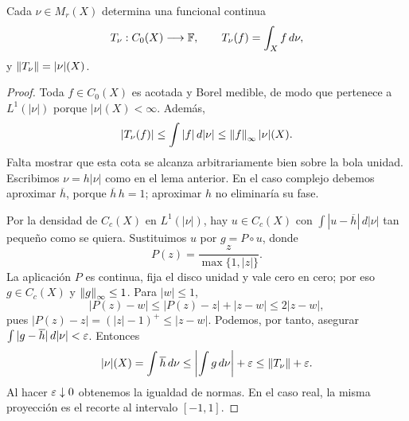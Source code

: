 \begin{teorema}\label{v2:riesz-isometria}
Cada $\nu\in M_r(X)$ determina una funcional continua
\[
 T_\nu:C_0(X)\longrightarrow\mathbb F,\qquad T_\nu(f)=\int_X f\,d\nu,
\]
y $\left\lVert T_\nu\right\rVert=|\nu|(X)$.
\end{teorema}
\begin{proof}
Toda $f\in C_0(X)$ es acotada y Borel medible, de modo que pertenece a $L^1(|\nu|)$ porque $|\nu|(X)<\infty$. Además,
\[
 |T_\nu(f)|\le\int|f|\,d|\nu|\le\left\lVert f\right\rVert_\infty |\nu|(X).
\]
Falta mostrar que esta cota se alcanza arbitrariamente bien sobre la bola unidad. Escribimos $\nu=h|\nu|$ como en el lema anterior. En el caso complejo debemos aproximar $\overline h$, porque $\overline h\,h=1$; aproximar $h$ no eliminaría su fase.

Por la densidad de $C_c(X)$ en $L^1(|\nu|)$, hay $u\in C_c(X)$ con $\int|u-\overline h|\,d|\nu|$ tan pequeño como se quiera. Sustituimos $u$ por $g=P\circ u$, donde
\[
 P(z)=\frac{z}{\max\{1,|z|\}}.
\]
La aplicación $P$ es continua, fija el disco unidad y vale cero en cero; por eso $g\in C_c(X)$ y $\left\lVert g\right\rVert_\infty\le1$. Para $|w|\le1$,
\[
 |P(z)-w|\le |P(z)-z|+|z-w|\le2|z-w|,
\]
pues $|P(z)-z|=(|z|-1)^+\le |z-w|$. Podemos, por tanto, asegurar $\int|g-\overline h|\,d|\nu|<\varepsilon$. Entonces
\[
 |\nu|(X)=\int\overline h\,d\nu
 \le\left|\int g\,d\nu\right|+\varepsilon
 \le\left\lVert T_\nu\right\rVert+\varepsilon.
\]
Al hacer $\varepsilon\downarrow0$ obtenemos la igualdad de normas. En el caso real, la misma proyección es el recorte al intervalo $[-1,1]$.
\end{proof}

